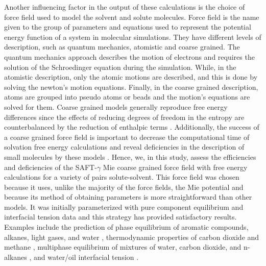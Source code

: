 {Another influencing factor in the output of these calculations is the choice of force field used to model the solvent and solute molecules. Force field is the name given to the group of parameters and equations used to represent the potential energy function of a system in molecular simulations. They have different levels of description, such as quantum mechanics, atomistic and coarse grained. The quantum mechanics approach describes the motion of electrons and requires the solution of the Schroedinger equation during the simulation. While, in the atomistic description, only the atomic motions are described,  and this is done by solving the newton's motion equations. Finally, in the coarse grained description, atoms are grouped into pseudo atoms or beads and the motion's equations are solved for them. Coarse grained models generally reproduce free energy differences since the effects of reducing degrees of freedom in the entropy are counterbalanced by the reduction of enthalpic terms \cite{kmiecik2016}. Additionally, the success of a coarse grained force field is important to decrease the computational time of solvation free energy calculations and reveal deficiencies in the description of small molecules by these models \cite{mobley2007,shirts2013}. Hence, we, in this study, assess the efficiencies and deficiencies of the SAFT-$\gamma$ Mie coarse grained force field  \cite{avendano2011} with free energy calculations for a variety of pairs solute-solvent. This force field was chosen because it uses, unlike the majority of the force fields, the Mie potential \cite{MIE} and because its method of obtaining parameters is more straightforward than other models. It was initially parameterized with pure component equilibrium and interfacial tension data \cite{avendano2011} and this strategy has provided satisfactory results. Examples include the prediction of phase equilibrium of aromatic compounds, alkanes, light gases, and water \cite{herdes2015,muller2017,lobanova2015} , thermodynamic properties of carbon dioxide and methane \cite{cassiano1}, multiphase equilibrium of mixtures of water, carbon dioxide, and n-alkanes \cite{lobanova2016}, and water/oil interfacial tension \cite{herdes2017}.} 


